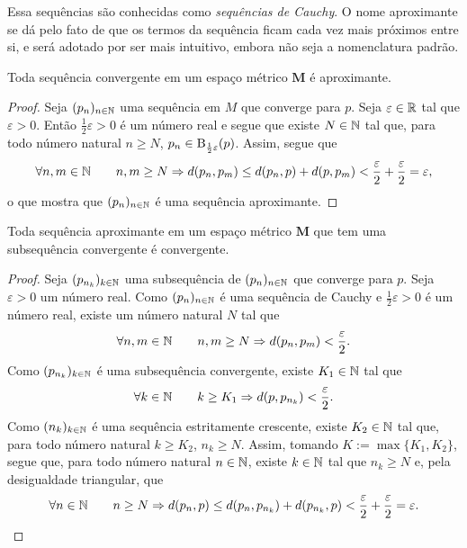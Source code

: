 Essa sequências são conhecidas como \emph{sequências de Cauchy}. O nome aproximante se dá pelo fato de que os termos da sequência ficam cada vez mais próximos entre si, e será adotado por ser mais intuitivo, embora não seja a nomenclatura padrão.

\begin{proposition}
Toda sequência convergente em um espaço métrico $\bm M$ é aproximante.
\end{proposition}
\begin{proof}
Seja $(p_n)_{n \in \mathbb{N}}$ uma sequência em $M$ que converge para $p$. Seja $\varepsilon \in \mathbb{R}$ tal que $\varepsilon > 0$. Então $\frac{1}{2}\varepsilon > 0$ é um número real e segue que existe $N \in \mathbb{N}$ tal que, para todo número natural $n \geq N$, $p_n \in \mathrm{B}_{\frac{1}{2}\varepsilon}(p)$. Assim, segue que	
	\begin{equation*}
	\forall n,m \in \mathbb{N} \qquad n,m \geq N \Rightarrow d(p_n,p_m) \leq d(p_n,p) + d(p,p_m) < \frac{\varepsilon}{2} + \frac{\varepsilon}{2} = \varepsilon,
	\end{equation*}
o que mostra que $(p_n)_{n \in \mathbb{N}}$ é uma sequência aproximante.
\end{proof}

\begin{proposition}
Toda sequência aproximante em um espaço métrico $\bm M$ que tem uma subsequência convergente é convergente.
\end{proposition}
\begin{proof}
	Seja $(p_{n_k})_{k \in \mathbb{N}}$ uma subsequência de $(p_n)_{n \in \mathbb{N}}$ que converge  para $p$. Seja $\varepsilon > 0$ um número real. Como $(p_n)_{n \in \mathbb{N}}$ é uma sequência de Cauchy e $\frac{1}{2}\varepsilon > 0$ é um número real, existe um número natural $N$ tal que
	\begin{equation*}
	\forall n,m \in \mathbb{N} \qquad n,m \geq N \Rightarrow d(p_n,p_m) < \frac{\varepsilon}{2}.
	\end{equation*}
Como $(p_{n_k})_{k \in \mathbb{N}}$ é uma subsequência convergente, existe $K_1 \in \mathbb{N}$ tal que
	\begin{equation*}
	\forall k \in \mathbb{N} \qquad k \geq K_1 \Rightarrow d(p,p_{n_k}) < \frac{\varepsilon}{2}.
	\end{equation*}
Como $(n_k)_{k \in \mathbb{N}}$ é uma sequência estritamente crescente, existe $K_2 \in \mathbb{N}$ tal que, para todo número natural $k \geq K_2$, $n_k \geq N$. Assim, tomando $K := \max\{K_1,K_2\}$, segue que, para todo número natural $n \in \mathbb{N}$, existe $k \in \mathbb{N}$ tal que $n_k \geq N$ e,  pela desigualdade triangular, que
	\begin{equation*}
	\forall n \in \mathbb{N} \qquad n \geq N \Rightarrow d(p_n,p) \leq d(p_n,p_{n_k}) + d(p_{n_k},p) < \frac{\varepsilon}{2}+\frac{\varepsilon}{2}=\varepsilon.
	\end{equation*}
\end{proof}

